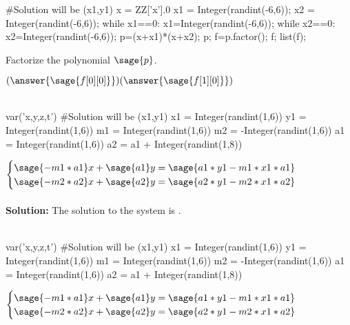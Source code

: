 \documentclass{ximera}
\begin{document}
\begin{shuffle}
\begin{question}
\begin{sagesilent}
#Solution will be (x1,y1)
x = ZZ['x'].0
x1 = Integer(randint(-6,6));
x2 = Integer(randint(-6,6));
while x1==0:
    x1=Integer(randint(-6,6));
while x2==0:
    x2=Integer(randint(-6,6));
p=(x+x1)*(x+x2);
p;
f=p.factor();
f;
list(f);

\end{sagesilent}

Factorize the polynomial $\sage{p}$.


$(\answer{\sage{f[0][0]}})(\answer{\sage{f[1][0]}})$\\\\

\end{question}
\begin{question}
\begin{sagesilent}
var('x,y,z,t')
#Solution will be (x1,y1)
x1 = Integer(randint(1,6))
y1 = Integer(randint(1,6))
m1 = Integer(randint(1,6))
m2 = -Integer(randint(1,6)) 
a1 = Integer(randint(1,6))
a2 = a1 + Integer(randint(1,8))
\end{sagesilent}
$\begin{cases}
\sage{-m1*a1}x+\sage{a1}y=\sage{a1*y1-m1*x1*a1}\\
\sage{-m2*a2}x+\sage{a2}y=\sage{a2*y1-m2*x1*a2}\\
\end{cases}$\\\\

{\bf Solution:} The solution to the system is 
.\\\\
\end{question}

\begin{question}
\begin{sagesilent}
var('x,y,z,t')
#Solution will be (x1,y1)
x1 = Integer(randint(1,6))
y1 = Integer(randint(1,6))
m1 = Integer(randint(1,6))
m2 = -Integer(randint(1,6)) 
a1 = Integer(randint(1,6))
a2 = a1 + Integer(randint(1,8))
\end{sagesilent}
$\begin{cases}
\sage{-m1*a1}x+\sage{a1}y=\sage{a1*y1-m1*x1*a1}\\
\sage{-m2*a2}x+\sage{a2}y=\sage{a2*y1-m2*x1*a2}\\
\end{cases}$\\\\


\end{question}
\end{shuffle}
\end{document}
